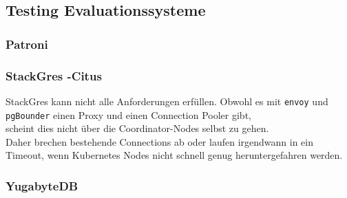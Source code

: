 
\begin{flushleft}
    \subsection{Testing Evaluationssysteme}
    \subsubsection{Patroni}
    
\end{flushleft}
\begin{flushleft}
    \subsubsection{StackGres -Citus}
    StackGres kann nicht alle Anforderungen erfüllen.
    Obwohl es mit \texttt{envoy} und \texttt{pgBounder} einen Proxy und einen Connection Pooler gibt,\\
    scheint dies nicht über die Coordinator-Nodes selbst zu gehen.\\
    Daher brechen bestehende Connections ab oder laufen irgendwann in ein Timeout, wenn \Gls{Kubernetes} Nodes nicht schnell genug heruntergefahren werden.
    
\end{flushleft}
\begin{flushleft}
    \subsubsection{YugabyteDB}
    
\end{flushleft}